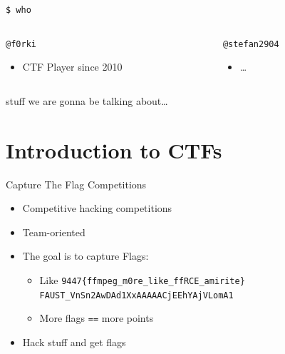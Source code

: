 \begin{frame}
  {\texttt{\$ who}}

  \begin{columns}
    \begin{column}{0.48\textwidth}
      {\texttt{@f0rki}}
      \begin{itemize}
        \item CTF Player since 2010
      \end{itemize}
    \end{column}

    \begin{column}{0.48\textwidth}
      \texttt{@stefan2904}
      \begin{itemize}
        \item \ldots
      \end{itemize}
    \end{column}
  \end{columns}

\end{frame}


\begin{frame}{stuff we are gonna be talking about\ldots}
    \tableofcontents
\end{frame}


\section{Introduction to CTFs}

\begin{frame}[fragile]
  {Capture The Flag Competitions}

  \begin{itemize}
    \item Competitive hacking competitions
    \item Team-oriented
    \item The goal is to capture Flags:
      \begin{itemize}
        \item Like
          \verb+9447{ffmpeg_m0re_like_ffRCE_amirite}+ \\
          \verb+FAUST_VnSn2AwDAd1XxAAAAACjEEhYAjVLomA1+
        \item More flags \verb+==+ more points
      \end{itemize}
    \item Hack stuff and get flags
  \end{itemize}

\end{frame}

